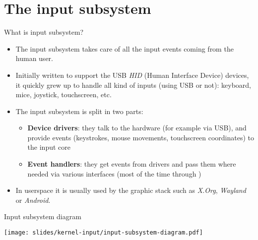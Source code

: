 \section{The input subsystem}

\begin{frame}{What is input subsystem?}
  \begin{itemize}
  \item The input subsystem takes care of all the input events coming
    from the human user.
  \item Initially written to support the USB {\em HID} (Human
    Interface Device) devices, it quickly grew up to handle all kind
    of inputs (using USB or not): keyboard, mice, joystick,
    touchscreen, etc.
  \item The input subsystem is split in two parts:
    \begin{itemize}
    \item {\bf Device drivers}: they talk to the hardware (for example
      via USB), and provide events (keystrokes, mouse movements,
      touchscreen coordinates) to the input core
    \item {\bf Event handlers}: they get events from drivers and pass
      them where needed via various interfaces (most of the time
      through )
    \end{itemize}
  \item In userspace it is usually used by the graphic stack such
    as {\em X.Org}, {\em Wayland} or {\em Android}.
  \end{itemize}
\end{frame}

\begin{frame}{Input subsystem diagram}
  \begin{center}
    \texttt{[image: slides/kernel-input/input-subsystem-diagram.pdf]}
  \end{center}
\end{frame}

